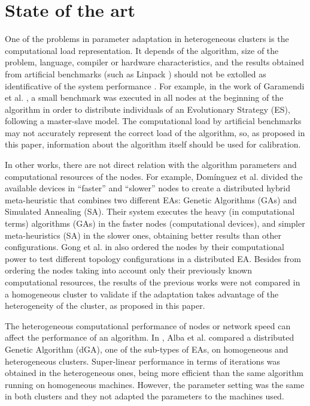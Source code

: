 \documentclass[final,1p,times]{elsarticle}
\begin{document}
%
\section{State of the art}
\label{sec:soa}



One of the problems in parameter adaptation in heterogeneous clusters is 
the computational load representation. It depends of the algorithm, size of the problem, 
language, compiler or hardware characteristics, and the results obtained from artificial 
benchmarks (such as  Linpack \cite{LinpackEndo10}) should not be extolled as identificative 
of the system performance \cite{LinpackDongarra03}. For example, in the work of Garamendi 
et al. \cite{PARALLELIMPLEMENTATION},  a small benchmark was executed in all nodes at the beginning
of the algorithm in order to distribute individuals of an Evolutionary Strategy
 (ES), following a master-slave model. The computational load by artificial benchmarks may not accurately 
 represent the correct load of the algorithm, so, as proposed in this paper, information 
 about the algorithm itself should be used for calibration.

In other works, there are not direct relation with the algorithm parameters and 
computational resources of the nodes. For example, Dom\'inguez et al. \cite{HYDROCM} 
divided the available devices in ``faster'' and ``slower'' nodes to create a distributed hybrid 
meta-heuristic that combines two different EAs: Genetic Algorithms (GAs) and Simulated
Annealing (SA). Their system executes the heavy (in computational
terms) algorithms (GAs) in the faster nodes (computational devices), and
simpler meta-heuristics (SA) in the slower ones, obtaining better results
than other configurations.  Gong et al. in \cite{HETEROGENEOUSTOPOLOGY} also ordered 
the nodes by their computational power to test different topology configurations in a distributed EA.
Besides from ordering the nodes taking into account 
only their previously known computational resources, the results of the previous works were not compared in a homogeneous 
cluster to validate if the adaptation takes advantage of the heterogeneity 
of the cluster, as proposed in this paper.

The heterogeneous computational performance of nodes or network speed can affect the performance of an algorithm. In \cite{HETEROGENEOUSHARD},
 Alba et al. compared a distributed Genetic Algorithm (dGA), one of
 the sub-types of EAs, on homogeneous and heterogeneous clusters. 
 Super-linear performance in terms of iterations was obtained in the heterogeneous ones,
 being more efficient than the same algorithm running on homogeneous
 machines. However, the parameter setting was the same in both
 clusters and they not adapted the parameters to the machines used. 
\end{document}
